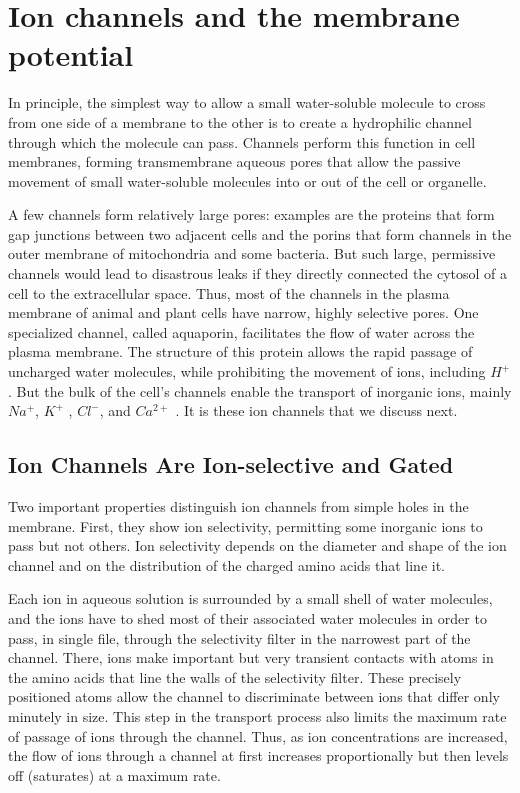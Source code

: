 \section{Ion channels and the membrane potential}

In principle, the simplest way to allow a small water-soluble molecule to
cross from one side of a membrane to the other is to create a hydrophilic
channel through which the molecule can pass. Channels perform this
function in cell membranes, forming transmembrane aqueous pores that
allow the passive movement of small water-soluble molecules into or out
of the cell or organelle.

A few channels form relatively large pores: examples are the proteins
that form gap junctions between two adjacent cells and the porins that
form channels in the outer membrane of mitochondria and some bacteria. But such large, permissive
channels would lead to disastrous leaks if they directly connected the
cytosol of a cell to the extracellular space. Thus, most of the channels
in the plasma membrane of animal and plant cells have narrow, highly
selective pores. One specialized channel, called aquaporin, facilitates the
flow of water across the plasma membrane. The structure of this protein
allows the rapid passage of uncharged water molecules, while prohibiting
the movement of ions, including $H^{+}$ . But the bulk of the cell’s channels
enable the transport of inorganic ions, mainly $Na^{+}$, $K^{+}$ , $Cl^{-}$, and $Ca^{2+}$ . It is
these ion channels that we discuss next.

\subsection{Ion Channels Are Ion-selective and Gated}

Two important properties distinguish ion channels from simple holes in
the membrane. First, they show ion selectivity, permitting some inorganic
ions to pass but not others. Ion selectivity depends on the diameter and
shape of the ion channel and on the distribution of the charged amino acids that line it.

Each ion in aqueous solution is surrounded by a small shell of water molecules,
and the ions have to shed most of their associated water molecules in
order to pass, in single file, through the selectivity filter in the narrowest
part of the channel. There, ions make important but very transient contacts
with atoms in the amino acids that line the walls of the selectivity
filter. These precisely positioned atoms allow the channel
to discriminate between ions that differ only minutely in size. This
step in the transport process also limits the maximum rate of passage of
ions through the channel. Thus, as ion concentrations are increased, the
flow of ions through a channel at first increases proportionally but then
levels off (saturates) at a maximum rate.

